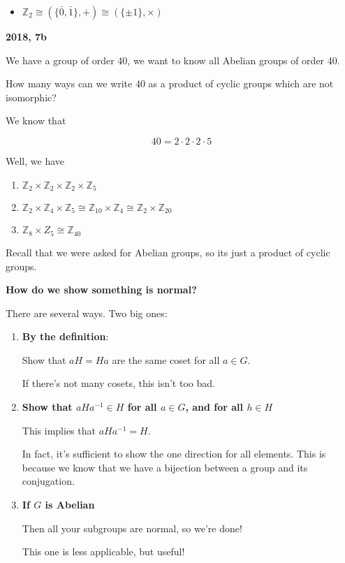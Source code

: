 \documentclass[12pt]{article}
\def\Z{{\mathbb Z}}
\theoremstyle{remark}
\theoremstyle{remark}
\theoremstyle{remark}
\theoremstyle{remark}
\theoremstyle{remark}
\begin{document}
\begin{itemize}
  \item $\Z_2 \cong (\{\bar 0, \bar 1\}, +) \cong (\{\pm 1\}, \times)$
\end{itemize}

{\bf 2018, 7b}

We have a group of order 40, we want to know all Abelian groups of order 40.

How many ways can we write 40 as a product of cyclic groups which are not
isomorphic?

We know that

\[
  40 = 2 \cdot 2 \cdot 2 \cdot 5
\]

Well, we have
\begin{enumerate}
  \item $\Z_2 \times \Z_2 \times \Z_2 \times \Z_5$
  \item $\Z_2 \times \Z_4 \times \Z_5 \cong \Z_{10} \times \Z_4 \cong \Z_2
    \times \Z_{20}$
  \item $\Z_8 \times Z_5 \cong \Z_{40}$
\end{enumerate}

Recall that we were asked for Abelian groups, so its just a product of cyclic
groups.

{\bf How do we show something is normal?}

There are several ways. Two big ones:

\begin{enumerate}
  \item {\bf By the definition}:

    Show that $aH = Ha$ are the same coset for all $a \in G$.

    If there's not many cosets, this isn't too bad.

  \item {\bf Show that $aHa^{-1} \in H$ for all $a \in G$, and for all $h \in H$}

    This implies that $aHa^{-1} = H$.

    In fact, it's sufficient to show the one direction for all elements. This is
    because we know that we have a bijection between a group and its
    conjugation.

  \item {\bf If $G$ is Abelian}

    Then all your subgroups are normal, so we're done!

    This one is less applicable, but useful!
\end{enumerate}
\end{document}
